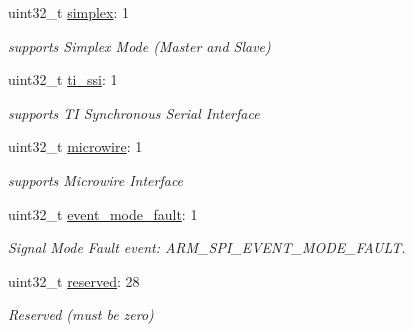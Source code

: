 \begin{DoxyCompactItemize}
\item 
\mbox{\label{struct___a_r_m___s_p_i___c_a_p_a_b_i_l_i_t_i_e_s_af244e2c2facf6414e3886495ee6b40bc}} 
uint32\+\_\+t \mbox{\hyperlink{struct___a_r_m___s_p_i___c_a_p_a_b_i_l_i_t_i_e_s_af244e2c2facf6414e3886495ee6b40bc}{simplex}}\+: 1
\begin{DoxyCompactList}\small\item\em supports Simplex Mode (Master and Slave) \end{DoxyCompactList}\item 
\mbox{\label{struct___a_r_m___s_p_i___c_a_p_a_b_i_l_i_t_i_e_s_a8053c540e5d531b692224bdc2463f36a}} 
uint32\+\_\+t \mbox{\hyperlink{struct___a_r_m___s_p_i___c_a_p_a_b_i_l_i_t_i_e_s_a8053c540e5d531b692224bdc2463f36a}{ti\+\_\+ssi}}\+: 1
\begin{DoxyCompactList}\small\item\em supports TI Synchronous Serial Interface \end{DoxyCompactList}\item 
\mbox{\label{struct___a_r_m___s_p_i___c_a_p_a_b_i_l_i_t_i_e_s_a9b4e858eb1d414128994742bf121f94c}} 
uint32\+\_\+t \mbox{\hyperlink{struct___a_r_m___s_p_i___c_a_p_a_b_i_l_i_t_i_e_s_a9b4e858eb1d414128994742bf121f94c}{microwire}}\+: 1
\begin{DoxyCompactList}\small\item\em supports Microwire Interface \end{DoxyCompactList}\item 
\mbox{\label{struct___a_r_m___s_p_i___c_a_p_a_b_i_l_i_t_i_e_s_a309619714f0c4febaa497ebdb9b7e3ca}} 
uint32\+\_\+t \mbox{\hyperlink{struct___a_r_m___s_p_i___c_a_p_a_b_i_l_i_t_i_e_s_a309619714f0c4febaa497ebdb9b7e3ca}{event\+\_\+mode\+\_\+fault}}\+: 1
\begin{DoxyCompactList}\small\item\em Signal Mode Fault event\+: A\+R\+M\+\_\+\+S\+P\+I\+\_\+\+E\+V\+E\+N\+T\+\_\+\+M\+O\+D\+E\+\_\+\+F\+A\+U\+LT. \end{DoxyCompactList}\item 
\mbox{\label{struct___a_r_m___s_p_i___c_a_p_a_b_i_l_i_t_i_e_s_aa43c4c21b173ada1b6b7568956f0d650}} 
uint32\+\_\+t \mbox{\hyperlink{struct___a_r_m___s_p_i___c_a_p_a_b_i_l_i_t_i_e_s_aa43c4c21b173ada1b6b7568956f0d650}{reserved}}\+: 28
\begin{DoxyCompactList}\small\item\em Reserved (must be zero) \end{DoxyCompactList}\end{DoxyCompactItemize}


